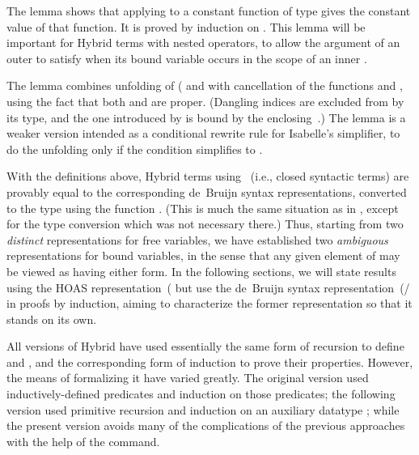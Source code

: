 \documentclass[copyright,creativecommons]{eptcs}
\begin{document}
\begin{Lem}
\label{lem:hybrid-Lbind-const} \formal

\end{Lem}


The lemma  shows that applying  to
a constant function of type  gives the constant value
of that function.  It is proved by induction on .
This lemma will be important for Hybrid terms with nested 
operators, to allow the argument of an outer  to satisfy 
when its bound variable occurs in the scope of an inner .

\begin{Lem}
\label{lem:hybrid-dB-LAM} \formal
\par\nopagebreak

\end{Lem}

The lemma  combines unfolding of 
( and  with cancellation of the functions  and
, using the fact that both  and
 are proper.  (Dangling indices are
excluded from  by its type, and the one introduced
by  is bound by the enclosing~.)
The lemma  is a weaker version intended as a conditional
rewrite rule for Isabelle's simplifier, to do the unfolding only if the
 condition simplifies to .

With the definitions above, Hybrid terms using \ (i.e., closed
syntactic terms) are provably equal to the corresponding de~Bruijn syntax
representations, converted to the type  using the function
.  (This is much the same situation as in
\cite{ambler/crole/momigliano:2002}, except for the type conversion
which was not necessary there.)  Thus, starting from two \emph{distinct}
representations for free variables, we have established two \emph{ambiguous}
representations for bound variables, in the sense that any given element
of  may be viewed as having either form.
In the following sections, we will state results using
the HOAS representation~( but use the de~Bruijn syntax
representation~(/ in proofs by induction, aiming to
characterize the former representation so that it stands on its own.

All versions of Hybrid have used essentially the same form of recursion to
define  and , and the corresponding form of induction
to prove their properties.  However, the means of formalizing it have varied
greatly.  The original version \cite{ambler/crole/momigliano:2002} used
inductively-defined predicates and induction on those predicates; the
following version \cite{momigliano/martin/felty:2008}
used primitive recursion and induction on an auxiliary datatype ;
while the present version avoids many of the complications of the previous
approaches with the help of the  command.
\end{document}
